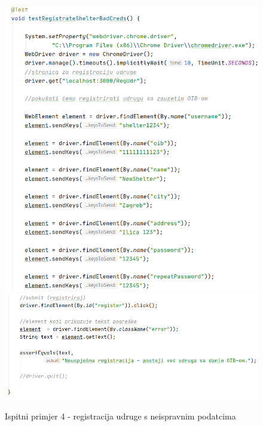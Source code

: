 			 \begin{figure}[H]
			 	\includegraphics[scale=0.7]{slike/Selenium4.1.PNG}
			 	\hspace*{0.1in}
			 	\includegraphics[scale=0.7]{slike/Selenium4.2.PNG} %
				\caption{Ispitni primjer 4 - registracija udruge s neispravnim podatcima}
			 	\centering
			 \end{figure}
		 
		 
